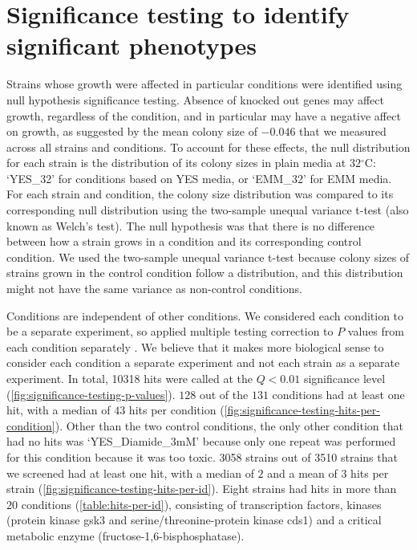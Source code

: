 \section{Significance testing to identify significant phenotypes}

Strains whose growth were affected in particular conditions were identified using null hypothesis significance testing. Absence of knocked out genes may affect growth, regardless of the condition, and in particular may have a negative affect on growth, as suggested by the mean colony size of $-0.046$ that we measured across all strains and conditions. To account for these effects, the null distribution for each strain is the distribution of its colony sizes in plain media at $32$$^{\circ}$C: `YES\_32' for conditions based on YES media, or `EMM\_32' for EMM media. For each strain and condition, the colony size distribution was compared to its corresponding null distribution using the two-sample unequal variance t-test (also known as Welch's test). The null hypothesis was that there is no difference between how a strain grows in a condition and its corresponding control condition. We used the two-sample unequal variance t-test because colony sizes of strains grown in the control condition follow a distribution, and this distribution might not have the same variance as non-control conditions.

Conditions are independent of other conditions. We considered each condition to be a separate experiment, so applied multiple testing correction to $P$ values from each condition separately \cite{Bourgon2010}. We believe that it makes more biological sense to consider each condition a separate experiment and not each strain as a separate experiment. In total, \num{10318} hits were called at the $Q < 0.01$ significance level (\ref{fig:significance-testing-p-values}). $128$ out of the $131$ conditions had at least one hit, with a median of $43$ hits per condition (\ref{fig:significance-testing-hits-per-condition}). Other than the two control conditions, the only other condition that had no hits was `YES\_Diamide\_3mM' because only one repeat was performed for this condition because it was too toxic.
\num{3058} strains out of \num{3510} strains that we screened had at least one hit, with a median of $2$ and a mean of $3$ hits per strain (\ref{fig:significance-testing-hits-per-id}). Eight strains had hits in more than $20$ conditions (\ref{table:hits-per-id}), consisting of transcription factors, kinases (protein kinase gsk3 and serine/threonine-protein kinase cds1) and a critical metabolic enzyme (fructose-1,6-bisphosphatase).

